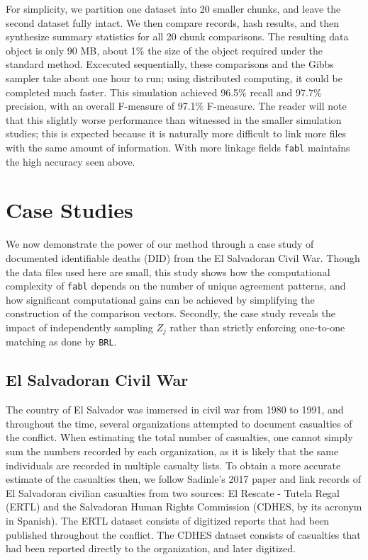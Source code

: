 \documentclass[12pt,letterpaper]{article}
\newcommand{\1}[1]{\mathbb{I}\!\left[#1\right]} %
\begin{document}
 For simplicity, we partition one dataset into 20 smaller chunks, and leave the second dataset fully intact. We then compare records, hash results, and then synthesize summary statistics for all 20 chunk comparisons. The resulting data object is only 90 MB, about 1\% the size of the object required under the standard method. Excecuted sequentially, these comparisons and the Gibbs sampler take about one hour to run; using distributed computing, it could be completed much faster. This simulation achieved 96.5\% recall and 97.7\% precision, with an overall F-measure of 97.1\% F-measure. The reader will note that this slightly worse performance than witnessed in the smaller simulation studies; this is expected because it is naturally more difficult to link more files with the same amount of information. With more linkage fields \texttt{fabl} maintains the high accuracy seen above. 
 
 

\section{Case Studies}
\label{sex:case-studies}

We now demonstrate the power of our method through a case study of documented identifiable deaths (DID) from the El Salvadoran Civil War. Though the data files used here are small, this study shows how the computational complexity of \texttt{fabl} depends on the number of unique agreement patterns, and how significant computational gains can be achieved by simplifying the construction of the comparison vectors. Secondly, the case study reveals the impact of independently sampling $Z_j$ rather than strictly enforcing one-to-one matching as done by \texttt{BRL}. 


\subsection{El Salvadoran Civil War}
\label{el_salvador}

The country of El Salvador was immersed in civil war from 1980 to 1991,
and throughout the time, several organizations attempted to document
casualties of the conflict. When estimating the total number of
casualties, one cannot simply sum the numbers recorded by each
organization, as it is likely that the same individuals are recorded in
multiple casualty lists. To obtain a more accurate estimate of the
casualties then, we follow Sadinle's 2017 paper and link records of El
Salvadoran civilian casualties from two sources: El Rescate - Tutela
Regal (ERTL) and the Salvadoran Human Rights Commission (CDHES, by its
acronym in Spanish). The ERTL dataset consists of digitized reports that
had been published throughout the conflict. The CDHES dataset consists
of casualties that had been reported directly to the organization, and
later digitized.
\end{document}
